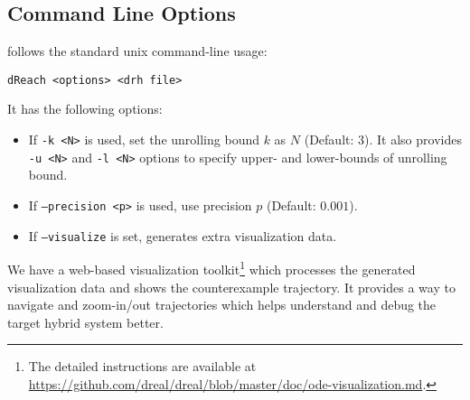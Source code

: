 \subsection{Command Line Options}
\dReach{} follows the standard unix command-line usage:
\begin{Verbatim}[fontfamily=courier, framesep=1mm, fontsize=\small]
dReach <options> <drh file>
\end{Verbatim}
It has the following options:
\begin{itemize}
\item If \texttt{-k <N>} is used, set the unrolling bound $k$ as $N$
  (Default: 3). It also provides \texttt{-u <N>} and \texttt{-l <N>}
  options to specify upper- and lower-bounds of unrolling bound.
\item If \texttt{--precision <p>} is used, use precision $p$ (Default: $0.001$).
\item If \texttt{--visualize} is set, \dReach{} generates extra visualization data.
\end{itemize}
We have a web-based visualization toolkit\footnote{The detailed
  instructions are available at
  \url{https://github.com/dreal/dreal/blob/master/doc/ode-visualization.md}.}
which processes the generated visualization data and shows the
counterexample trajectory. It provides a way to navigate and
zoom-in/out trajectories which helps understand and debug the target
hybrid system better.

